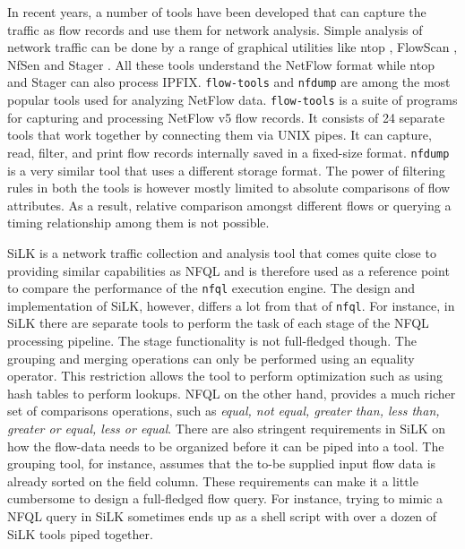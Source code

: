 In recent years, a number of tools have been developed that can capture the
traffic as flow records and use them for network analysis. Simple analysis of
network traffic can be done by a range of graphical utilities like ntop
\cite{ntop:2000}, FlowScan \cite{flowscan:2000}, NfSen \cite{phaag:2006} and
Stager \cite{oslebo:2006}. All these tools understand the NetFlow format while
ntop and Stager can also process \ac{IPFIX}. \texttt{flow-tools} and
\texttt{nfdump} are among the most popular tools used for analyzing NetFlow
data. \texttt{flow-tools} \cite{sromig:2000} is a suite of programs for
capturing and processing NetFlow v5 flow records. It consists of 24 separate
tools that work together by connecting them via UNIX pipes. It can capture,
read, filter, and print flow records internally saved in a fixed-size format.
\texttt{nfdump} \cite{phaag:2006} is a very similar tool that uses a different
storage format. The power of filtering rules in both the tools is however
mostly limited to absolute comparisons of flow attributes. As a result,
relative comparison amongst different flows or querying a timing relationship
among them is not possible.


SiLK \cite{SiLK} is a network traffic collection and analysis tool that comes
quite close to providing similar capabilities as \ac{NFQL} and is therefore
used as a reference point to compare the performance of the \texttt{nfql}
execution engine. The design and implementation of SiLK, however, differs a
lot from that of \texttt{nfql}. For instance, in SiLK there are separate tools
to perform the task of each stage of the \ac{NFQL} processing pipeline. The
stage functionality is not full-fledged though. The grouping and merging
operations can only be performed using an equality operator. This restriction
allows the tool to perform optimization such as using hash tables to perform
lookups.  \ac{NFQL} on the other hand, provides a much richer set of
comparisons operations, such as \emph{equal, not equal, greater than, less
than, greater or equal, less or equal}. There are also stringent requirements
in SiLK on how the flow-data needs to be organized before it can be piped into
a tool. The grouping tool, for instance, assumes that the to-be supplied input
flow data is already sorted on the field column.  These requirements can make
it a little cumbersome to design a full-fledged flow query.  For instance,
trying to mimic a \ac{NFQL} query in SiLK sometimes ends up as a shell script
with over a dozen of SiLK tools piped together.
